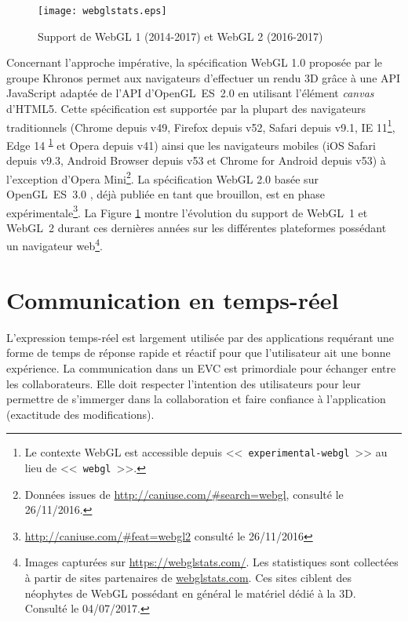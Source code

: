 
\begin{figure}[hbt]
	\centering
	\texttt{[image: webglstats.eps]}
	\caption{Support de WebGL 1 (2014-2017) et WebGL 2 
		(2016-2017)}
	\label{fig:webglstats}
\end{figure}

Concernant l'approche impérative, la spécification WebGL 1.0 \cite{Khronos2011} 
proposée par le groupe Khronos permet aux navigateurs d'effectuer un rendu 3D 
grâce à une \gls{API} JavaScript adaptée de l'\gls{API} d'OpenGL~ES~2.0 
\cite{Khronos2007} en utilisant l'élément \textit{canvas} d'\gls{HTML}5. Cette 
spécification est supportée par la plupart des navigateurs traditionnels (Chrome 
depuis v49, Firefox depuis v52, Safari depuis v9.1, IE 11\footnote{Le contexte 
	WebGL est accessible depuis <<~\texttt{experimental-webgl}~>> au lieu de 
	<<~\texttt{webgl}~>>.\label{fn:webglcontext}}, Edge 14\textsuperscript{ 
	\ref{fn:webglcontext}} et Opera depuis v41) ainsi que les navigateurs mobiles 
	(iOS 
Safari depuis v9.3, Android Browser depuis v53 et Chrome for Android depuis v53) 
à l'exception d'Opera Mini\footnote{Données issues de 
	\url{http://caniuse.com/\#search=webgl}, consulté le 26/11/2016.}. La 
	spécification 
WebGL 2.0 \cite{Khronos2016} basée sur OpenGL~ES~3.0 \cite{Khronos2008}, 
déjà publiée en tant que brouillon, est en phase 
expérimentale\footnote{\url{http://caniuse.com/\#feat=webgl2} consulté le 
	26/11/2016}. La Figure 
\ref{fig:webglstats} montre l'évolution du support de WebGL~1 et WebGL~2 durant 
ces dernières années sur les différentes plateformes possédant un navigateur 
web\footnote{Images capturées sur \url{https://webglstats.com/}. Les statistiques 
	sont collectées à partir de sites partenaires de \url{webglstats.com}. Ces sites 
	ciblent des néophytes de WebGL possédant  en général le matériel 
	dédié à la 3D. Consulté le 04/07/2017.}.

\section{Communication en temps-réel}
L'expression temps-réel est largement utilisée par des applications requérant une 
forme de temps de réponse rapide et réactif pour que l'utilisateur ait une bonne 
expérience. La communication dans un \gls{EVC} est primordiale pour échanger entre les collaborateurs. Elle doit respecter l'intention des utilisateurs pour leur permettre de s'immerger dans la collaboration et faire confiance à l'application (exactitude des modifications).

